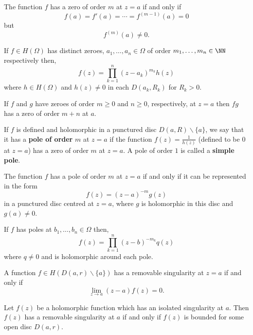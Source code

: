 \documentclass[12pt, a4paper]{article}
\begin{document}
\begin{mdprop}
    The function \(f\) has a zero of order \(m\) at \(z=a\) if and only if 
    \[f(a) = f'(a) =\cdots = f^{(m-1)}(a)=0\]
    but 
    \[f^{(m)}(a) \neq 0.\]
\end{mdprop}

\begin{proposition}
    If \(f \in H(\Omega)\) has distinct zeroes, \(a_1,\ldots,a_n \in \Omega\) of order \(m_1,\ldots, m_n \in \NN\) respectively then,
    \[f(z)= \prod_{k=1}^n (z-a_k)^{m_k} h(z)\]
    where \(h \in H(\Omega)\) and \(h(z) \neq 0\) in each \(D(a_k,R_k)\) for \(R_k>0\).
\end{proposition}

\begin{mdprop}
    If \(f\) and \(g\) have zeroes of order \(m\geq 0\) and \(n \geq 0\), respectively, at \(z=a\) then \(fg\) has a zero of order \(m+n\) at \(a\). 
\end{mdprop}

\begin{definition}
    If \(f\) is defined and holomorphic in a punctured disc \(D(a,R) \backslash \{a\}\), we say that it has a \textbf{pole of order} \(m\) at \(z=a\) if the function \(f(z) = \frac{1}{h(z)}\) (defined to be \(0\) at \(z=a\)) has a zero of order \(m\) at \(z=a\). A pole of order \(1\) is called a \textbf{simple pole}.
\end{definition}

\begin{lemma}
    The function \(f\) has a pole of order \(m\) at \(z=a\) if and only if it can be represented in the form 
    \[f(z) = (z-a)^{-m}g(z)\]
    in a punctured disc centred at \(z=a\), where \(g\) is holomorphic in this disc and \(g(a) \neq 0\).
\end{lemma}

\begin{proposition}
    If \(f\) has poles at \(b_1,\ldots,b_n \in \Omega\) then,
    \[f(z) = \prod_{k=1}^n (z-b)^{-m_k} q(z) \]
    where \(q \neq 0\) and is holomorphic around each pole.
\end{proposition}

\begin{mdthm}
    A function \(f \in H(D(a,r) \backslash \{a\})\) has a removable singularity at \(z=a\) if and only if 
    \[\lim_{z\to a} (z-a)f(z)=0.\]
\end{mdthm}

\begin{mdprop} Let \(f(z)\) be a holomorphic function which has an isolated singularity at \(a\). Then \(f(z)\) has a removable singularity at \(a\) if and only if \(f(z)\) is bounded for some open disc \(D(a,r)\).
\end{mdprop}
\end{document}
